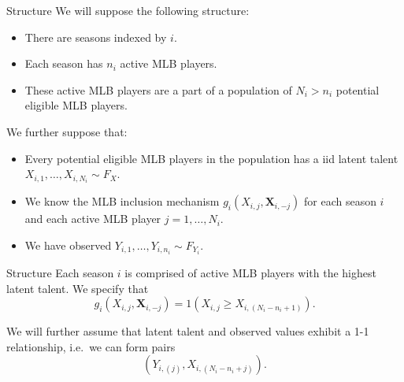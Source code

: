 \documentclass[
  ignorenonframetext,
]{beamer}
\providecommand{\tightlist}{%
  \setlength{\itemsep}{0pt}\setlength{\parskip}{0pt}}
\begin{document}
\begin{frame}{Structure}
\protect\hypertarget{structure}{}
We will suppose the following structure:

\begin{itemize}
\tightlist
\item
  There are seasons indexed by \(i\).
\item
  Each season has \(n_i\) active MLB players.
\item
  These active MLB players are a part of a population of \(N_i > n_i\)
  potential eligible MLB players.
\end{itemize}

\vspace{12pt}

We further suppose that:

\begin{itemize}
\tightlist
\item
  Every potential eligible MLB players in the population has a iid
  latent talent \(X_{i,1},\ldots,X_{i,N_i} \sim F_{X}\).
\item
  We know the MLB inclusion mechanism
  \(g_i(X_{i,j}, \textbf{X}_{i,-j})\) for each season \(i\) and each
  active MLB player \(j = 1,\ldots,N_i\).
\item
  We have observed \(Y_{i,1},\ldots,Y_{i,n_i} \sim F_{Y_i}\).
\end{itemize}
\end{frame}

\begin{frame}{Structure}
\protect\hypertarget{structure-1}{}
Each season \(i\) is comprised of active MLB players with the highest
latent talent. We specify that \[
  g_i(X_{i,j}, \textbf{X}_{i,-j}) = 1(X_{i,j} \geq X_{i,(N_i-n_i+1)}).
\]

\vspace{12pt}

We will further assume that latent talent and observed values exhibit a
1-1 relationship, i.e.~we can form pairs \[
  \left(Y_{i,(j)}, X_{i,(N_i-n_i+j)}\right).
\]
\end{frame}
\end{document}
